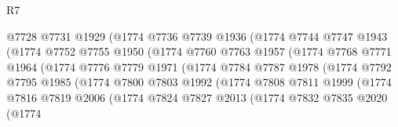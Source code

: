 \begin{lexlean}{R7}
\begin{coremodule}
                            @7728
                            @7731
                            @1929
                            (@1774
                              @7736
                              @7739
                              @1936
                              (@1774
                                @7744
                                @7747
                                @1943
                                (@1774
                                  @7752
                                  @7755
                                  @1950
                                  (@1774
                                    @7760
                                    @7763
                                    @1957
                                    (@1774
                                      @7768
                                      @7771
                                      @1964
                                      (@1774
                                        @7776
                                        @7779
                                        @1971
                                        (@1774
                                          @7784
                                          @7787
                                          @1978
                                          (@1774
                                            @7792
                                            @7795
                                            @1985
                                            (@1774
                                              @7800
                                              @7803
                                              @1992
                                              (@1774
                                                @7808
                                                @7811
                                                @1999
                                                (@1774
                                                  @7816
                                                  @7819
                                                  @2006
                                                  (@1774
                                                    @7824
                                                    @7827
                                                    @2013
                                                    (@1774
                                                      @7832
                                                      @7835
                                                      @2020
                                                      (@1774

\end{coremodule}
\end{lexlean}
